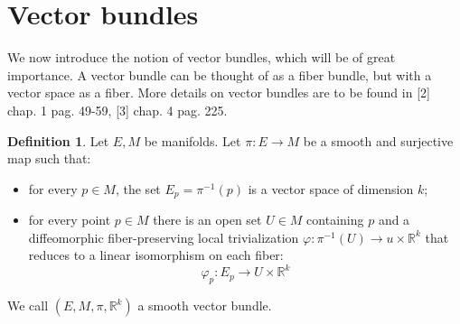 \documentclass[12pt,a4paper]{report}
\theoremstyle{definition}
\newtheorem{Def}{Definition}[chapter]
\theoremstyle{Theorem}
\theoremstyle{definition}
\theoremstyle{definition}
\begin{document}
			\section{Vector bundles}
			We now introduce the notion of vector bundles, which will be of great importance. A vector bundle can be thought of as a fiber bundle, but with a vector space as a fiber. More details on vector bundles are to be found in [2] chap. 1 pag. 49-59, [3] chap. 4 pag. 225.
			\begin{Def}\label{Def_5.2}
				Let $E,M$ be manifolds. Let $\pi:E\rightarrow M$ be a smooth and surjective map such that:
				\begin{itemize}
					\item for every $p\in M$, the set $E_p=\pi^{-1}(p)$ is a vector space of dimension $k$;
					\item for every point $p\in M$ there is an open set $U\in M$ containing $p$ and a diffeomorphic fiber-preserving local trivialization $\varphi:\pi^{-1}(U)\rightarrow u\times \mathbb{R}^k$ that reduces to a linear isomorphism on each fiber:
					$$\varphi_p:E_p\rightarrow U\times \mathbb{R}^k$$
				\end{itemize}
				We call $(E,M,\pi,\mathbb{R}^k)$ a smooth vector bundle.
			\end{Def}
\end{document}

